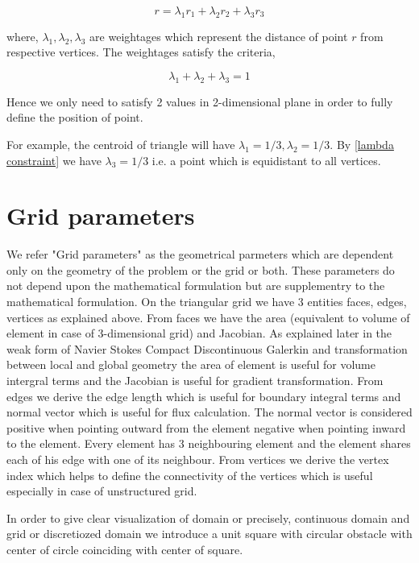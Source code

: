 \documentclass[a4paper,12pt]{book}
\begin{document}
\begin{equation}\label{barycentric point}
r = \lambda_1 r_1 + \lambda_2 r_2 + \lambda_3 r_3
\end{equation}

where, $\lambda_1, \lambda_2, \lambda_3$ are weightages which represent the distance of point $r$ from respective vertices. The weightages satisfy the criteria,

\begin{equation}\label{lambda constraint}
\lambda_1 + \lambda_2 + \lambda_3 = 1
\end{equation}

Hence we only need to satisfy 2 values in 2-dimensional plane in order to fully define the position of point.

For example, the centroid of triangle will have $\lambda_1 = 1/3, \lambda_2 = 1/3$. By \eqref{lambda constraint} we have $\lambda_3=1/3$ i.e. a point which is equidistant to all vertices.

\section{Grid parameters}

We refer "Grid parameters" as the geometrical parmeters which are dependent only on the geometry of the problem or the grid or both. These parameters do not depend upon the mathematical formulation but are supplementry to the mathematical formulation. On the triangular grid we have 3 entities faces, edges, vertices as explained above. From faces we have the area (equivalent to volume of element in case of 3-dimensional grid) and Jacobian. As explained later in the weak form of Navier Stokes Compact Discontinuous Galerkin and transformation between local and global geometry the area of element is useful for volume intergral terms and the Jacobian is useful for gradient transformation. From edges we derive the edge length which is useful for boundary integral terms and normal vector which is useful for flux calculation. The normal vector is considered positive when pointing outward from the element negative when pointing inward to the element. Every element has 3 neighbouring element and the element shares each of his edge with one of its neighbour. From vertices we derive the vertex index which helps to define the connectivity of the vertices which is useful especially in case of unstructured grid. 

In order to give clear visualization of domain or precisely, continuous domain and grid or discretiozed domain we introduce a unit square with circular obstacle with center of circle coinciding with center of square. 
\end{document}
